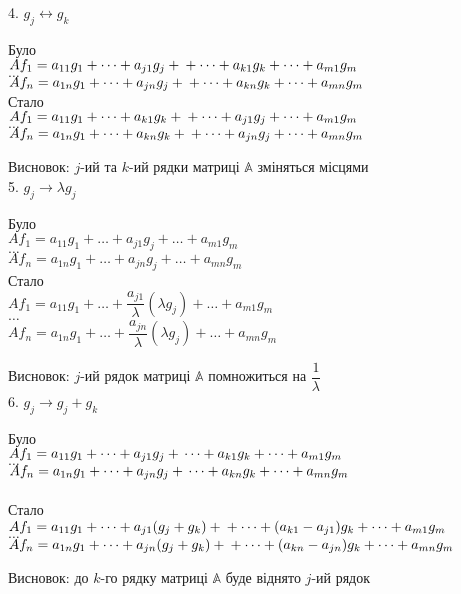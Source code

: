 \documentclass[a4paper, 14pt]{extarticle}
\def\bigline{\vspace{5mm}\\}
\begin{document}
	4. $g_j \leftrightarrow g_k$
	\multicolsep=0pt
	\begin{multicols}{2}
	Було \\
	$Af_1 = a_{11}g_1 + \dots + a_{j1}g_j + \\
	+ \dots + a_{k1}g_k + \dots + a_{m1}g_m$ \\
	$\dots$\\
	$Af_n = a_{1n}g_1 + \dots + a_{jn}g_j + \\
	+ \dots + a_{kn}g_k + \dots + a_{mn}g_m$
	\columnbreak
	\\
	Стало \\
	$Af_1 = a_{11}g_1 + \dots + a_{k1}g_k + \\
	+ \dots + a_{j1}g_j + \dots + a_{m1}g_m$ \\
	$\dots$\\
	$Af_n = a_{1n}g_1 + \dots + a_{kn}g_k + \\
	+ \dots + a_{jn}g_j + \dots + a_{mn}g_m$
	\end{multicols}
	Висновок: $j$-ий та $k$-ий рядки матриці $\mathbb{A}$ зміняться місцями
	\bigline
	5. $g_j \rightarrow \lambda g_j$
	\multicolsep=0pt
	\begin{multicols}{2}
	Було \\
	$Af_1 = a_{11}g_1 + \dots + a_{j1}g_j + \dots + a_{m1}g_m$\\
	$\dots$\\
	$Af_n = a_{1n}g_1 + \dots + a_{jn}g_j + \dots + a_{mn}g_m$
	\columnbreak
	\\
	Стало \\
	$Af_1 = a_{11}g_1 + \dots + \dfrac{a_{j1}}{\lambda} (\lambda g_j) + \dots + a_{m1}g_m$\\
	$\dots$\\
	$Af_n = a_{1n}g_1 + \dots + \dfrac{a_{jn}}{\lambda} (\lambda g_j) + \dots + a_{mn}g_m$
	\end{multicols}
	Висновок: $j$-ий рядок матриці $\mathbb{A}$ помножиться на $\dfrac{1}{\lambda}$
	\bigline
	6. $g_j \rightarrow g_j + g_k$
	\multicolsep=0pt
	\begin{multicols}{2}
	Було \\
	$Af_1 = a_{11}g_1 + \dots + a_{j1}g_j + \\ \dots + a_{k1}g_k + \dots + a_{m1}g_m$\\
	$\dots$\\
	$Af_n = a_{1n}g_1 + \dots + a_{jn}g_j + \\ \dots + a_{kn}g_k + \dots + a_{mn}g_m$\\
	\columnbreak
	\\
	Стало \\
	$Af_1 = a_{11}g_1 + \dots + a_{j1}(g_j+g_k) + \\ + \dots + (a_{k1}-a_{j1})g_k + \dots + a_{m1}g_m$\\
	$\dots$\\
	$Af_n = a_{1n}g_1 + \dots + a_{jn}(g_j+g_k) + \\ + \dots + (a_{kn}-a_{jn})g_k + \dots + a_{mn}g_m$
	\end{multicols}
	Висновок: до $k$-го рядку матриці $\mathbb{A}$ буде віднято $j$-ий рядок
\end{document}
